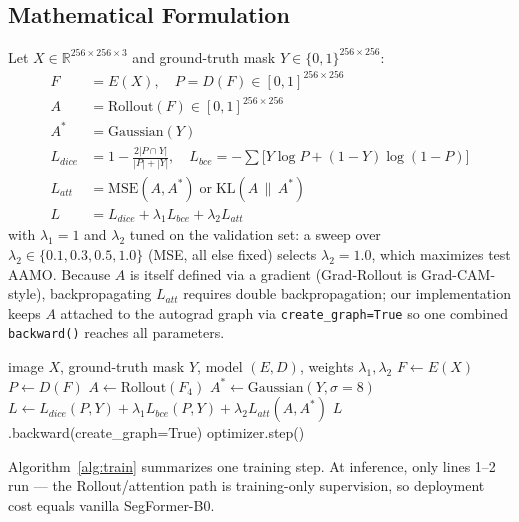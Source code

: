 \documentclass[sigconf,review]{acmart}
\begin{document}
\subsection{Mathematical Formulation}
\label{sec:formulation}
Let $X \in \mathbb{R}^{256\times256\times3}$ and ground-truth mask
$Y \in \{0,1\}^{256\times256}$:
\begin{align}
F &= E(X),\quad P = D(F) \in [0,1]^{256\times256} \\
A &= \mathrm{Rollout}(F) \in [0,1]^{256\times256} \\
A^{*} &= \mathrm{Gaussian}(Y) \\
L_{dice} &= 1 - \frac{2|P\cap Y|}{|P|+|Y|}, \quad
L_{bce} = -\sum \big[Y\log P + (1{-}Y)\log(1{-}P)\big] \\
L_{att} &= \mathrm{MSE}(A, A^{*}) \;\text{or}\; \mathrm{KL}(A \,\|\, A^{*}) \\
L &= L_{dice} + \lambda_1 L_{bce} + \lambda_2 L_{att}
\end{align}
with $\lambda_1{=}1$ and $\lambda_2$ tuned on the validation set: a sweep
over $\lambda_2 \in \{0.1, 0.3, 0.5, 1.0\}$ (MSE, all else fixed) selects
$\lambda_2{=}1.0$, which maximizes test AAMO.
Because $A$ is itself defined via a gradient (Grad-Rollout is
Grad-CAM-style), backpropagating $L_{att}$ requires double backpropagation;
our implementation keeps $A$ attached to the autograd graph via
\texttt{create\_graph=True} so one combined \texttt{backward()} reaches all
parameters.

\begin{algorithm}[t]
\caption{One training step of the attention-consistency variant}
\label{alg:train}
\begin{algorithmic}[1]
\Require image $X$, ground-truth mask $Y$, model $(E, D)$, weights $\lambda_1,\lambda_2$
\State $F \gets E(X)$ 
\State $P \gets D(F)$ 
\State $A \gets \mathrm{Rollout}(F_4)$ 
\State $A^{*} \gets \mathrm{Gaussian}(Y, \sigma{=}8)$ 
\State $L \gets L_{dice}(P,Y) + \lambda_1 L_{bce}(P,Y) + \lambda_2 L_{att}(A,A^{*})$
\State $L$.backward(create\_graph=True) 
\State optimizer.step()
\end{algorithmic}
\end{algorithm}

Algorithm~\ref{alg:train} summarizes one training step. At inference, only
lines 1--2 run --- the Rollout/attention path is training-only supervision,
so deployment cost equals vanilla SegFormer-B0.
\end{document}
